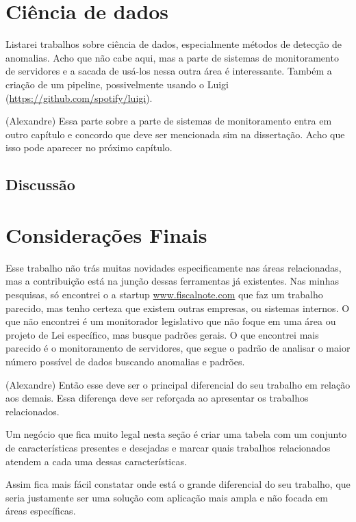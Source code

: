 \section{Ciência de dados}

Listarei trabalhos sobre ciência de dados, especialmente métodos de detecção de anomalias. Acho que não cabe aqui, mas a parte de sistemas de monitoramento de servidores e a sacada de usá-los nessa outra área é interessante. Também a criação de um pipeline, possivelmente usando o Luigi (\url{https://github.com/spotify/luigi}).


(Alexandre) Essa parte sobre a parte de sistemas de monitoramento entra em outro capítulo e concordo que deve ser mencionada sim na dissertação. Acho que isso pode aparecer no próximo capítulo.


\subsection{Discussão}

\section{Considerações Finais}

Esse trabalho não trás muitas novidades especificamente nas áreas relacionadas, mas a contribuição está na junção dessas ferramentas já existentes. Nas minhas pesquisas, só encontrei o a startup \url{www.fiscalnote.com} que faz um trabalho parecido, mas tenho certeza que existem outras empresas, ou sistemas internos. O que não encontrei é um monitorador legislativo que não foque em uma área ou projeto de Lei específico, mas busque padrões gerais. O que encontrei mais parecido é o monitoramento de servidores, que segue o padrão de analisar o maior número possível de dados buscando anomalias e padrões.


(Alexandre) Então esse deve ser o principal diferencial do seu trabalho em relação aos demais. Essa diferença deve ser reforçada ao apresentar os trabalhos relacionados.

Um negócio que fica muito legal nesta seção é criar uma tabela com um conjunto de características presentes e desejadas e marcar quais trabalhos relacionados atendem a cada uma dessas características.

Assim fica mais fácil constatar onde está o grande diferencial do seu trabalho, que seria justamente ser uma solução com aplicação mais ampla e não focada em áreas específicas.
